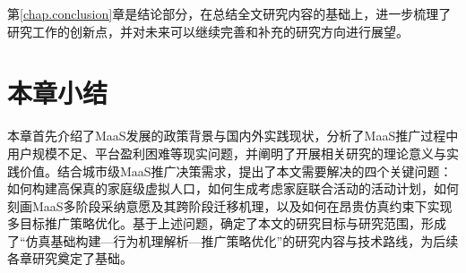第\ref{chap.conclusion}章是结论部分，在总结全文研究内容的基础上，进一步梳理了研究工作的创新点，并对未来可以继续完善和补充的研究方向进行展望。

\section{本章小结}\label{sec.intro.summary}

本章首先介绍了MaaS发展的政策背景与国内外实践现状，分析了MaaS推广过程中用户规模不足、平台盈利困难等现实问题，并阐明了开展相关研究的理论意义与实践价值。结合城市级MaaS推广决策需求，提出了本文需要解决的四个关键问题：如何构建高保真的家庭级虚拟人口，如何生成考虑家庭联合活动的活动计划，如何刻画MaaS多阶段采纳意愿及其跨阶段迁移机理，以及如何在昂贵仿真约束下实现多目标推广策略优化。基于上述问题，确定了本文的研究目标与研究范围，形成了“仿真基础构建—行为机理解析—推广策略优化”的研究内容与技术路线，为后续各章研究奠定了基础。

